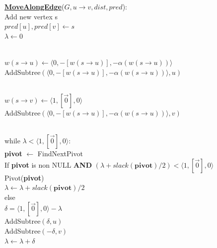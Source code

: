 \documentclass{article}
\begin{document}
\begin{algorithm}
\textbf{\underline{MoveAlongEdge}}($G, u \rightarrow v, dist, pred$): \\ \quad
Add new vertex s \\ \quad
$pred[u], pred[v] \leftarrow s$ \\ \quad
$\lambda \leftarrow 0$ \\ \\ \quad

$w(s \rightarrow u) \leftarrow \langle 0, -[w(s \rightarrow u)], 
-\alpha(w(s \rightarrow u)) \rangle$ \\ \quad
AddSubtree$(\langle 0, -[w(s \rightarrow u)], 
-\alpha(w(s \rightarrow u)) \rangle, u)$ \\ \\ \quad

$w(s \rightarrow v) \leftarrow \langle 1, [\vec{0}], 0 \rangle$ \\ \quad
AddSubtree$(\langle 0, -[w(s \rightarrow u)], 
-\alpha(w(s \rightarrow u)) \rangle, v)$ \\ \\ \quad

while $\lambda < \langle 1, [\vec{0}], 0 \rangle$: \\ \quad \quad
    \textbf{pivot} $\leftarrow $ FindNextPivot \\ \quad \quad
    If \textbf{pivot} is non NULL \textbf{AND} 
    $(\lambda + slack(\textbf{pivot}) / 2) < \langle 1, [\vec{0}], 0 \rangle$ \\ \qquad \quad
        Pivot(\textbf{pivot}) \\ \qquad \quad
        $\lambda \leftarrow \lambda + slack(\textbf{pivot}) / 2$ \\ \quad \quad
    else \\ \qquad \quad
        $\delta = \langle 1, [\vec{0}], 0 \rangle - \lambda$ \\ \qquad \quad
        AddSubtree$(\delta, u)$ \\ \qquad \quad
        AddSubtree$(-\delta, v)$ \\ \qquad \quad
        $\lambda \leftarrow \lambda + \delta$ \\
\end{algorithm}

\newpage
\end{document}
